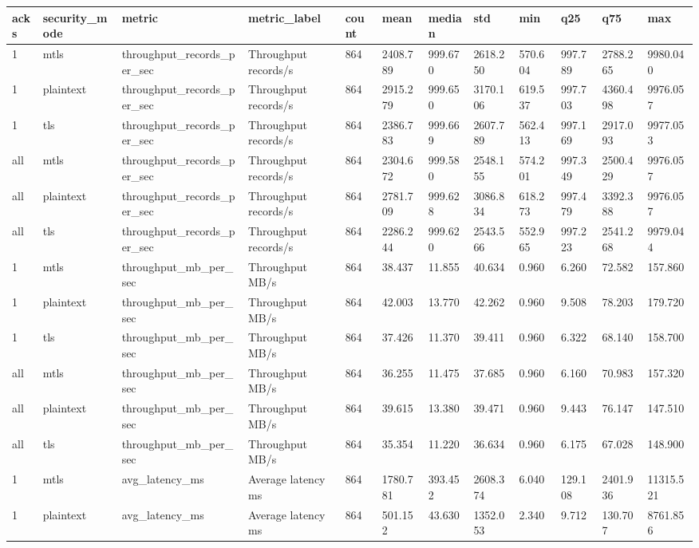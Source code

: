 \begin{longtable}{llllllllllll}
\hline
acks & security\_mode & metric & metric\_label & count & mean & median & std & min & q25 & q75 & max \\
\hline
1 & mtls & throughput\_records\_per\_sec & Throughput records/s & 864 & 2408.789 & 999.670 & 2618.250 & 570.604 & 997.789 & 2788.265 & 9980.040 \\
1 & plaintext & throughput\_records\_per\_sec & Throughput records/s & 864 & 2915.279 & 999.650 & 3170.106 & 619.537 & 997.703 & 4360.498 & 9976.057 \\
1 & tls & throughput\_records\_per\_sec & Throughput records/s & 864 & 2386.783 & 999.669 & 2607.789 & 562.413 & 997.169 & 2917.093 & 9977.053 \\
all & mtls & throughput\_records\_per\_sec & Throughput records/s & 864 & 2304.672 & 999.580 & 2548.155 & 574.201 & 997.349 & 2500.429 & 9976.057 \\
all & plaintext & throughput\_records\_per\_sec & Throughput records/s & 864 & 2781.709 & 999.628 & 3086.834 & 618.273 & 997.479 & 3392.388 & 9976.057 \\
all & tls & throughput\_records\_per\_sec & Throughput records/s & 864 & 2286.244 & 999.620 & 2543.566 & 552.965 & 997.223 & 2541.268 & 9979.044 \\
1 & mtls & throughput\_mb\_per\_sec & Throughput MB/s & 864 & 38.437 & 11.855 & 40.634 & 0.960 & 6.260 & 72.582 & 157.860 \\
1 & plaintext & throughput\_mb\_per\_sec & Throughput MB/s & 864 & 42.003 & 13.770 & 42.262 & 0.960 & 9.508 & 78.203 & 179.720 \\
1 & tls & throughput\_mb\_per\_sec & Throughput MB/s & 864 & 37.426 & 11.370 & 39.411 & 0.960 & 6.322 & 68.140 & 158.700 \\
all & mtls & throughput\_mb\_per\_sec & Throughput MB/s & 864 & 36.255 & 11.475 & 37.685 & 0.960 & 6.160 & 70.983 & 157.320 \\
all & plaintext & throughput\_mb\_per\_sec & Throughput MB/s & 864 & 39.615 & 13.380 & 39.471 & 0.960 & 9.443 & 76.147 & 147.510 \\
all & tls & throughput\_mb\_per\_sec & Throughput MB/s & 864 & 35.354 & 11.220 & 36.634 & 0.960 & 6.175 & 67.028 & 148.900 \\
1 & mtls & avg\_latency\_ms & Average latency ms & 864 & 1780.781 & 393.452 & 2608.374 & 6.040 & 129.108 & 2401.936 & 11315.521 \\
1 & plaintext & avg\_latency\_ms & Average latency ms & 864 & 501.152 & 43.630 & 1352.053 & 2.340 & 9.712 & 130.707 & 8761.856 \\

\end{longtable}
